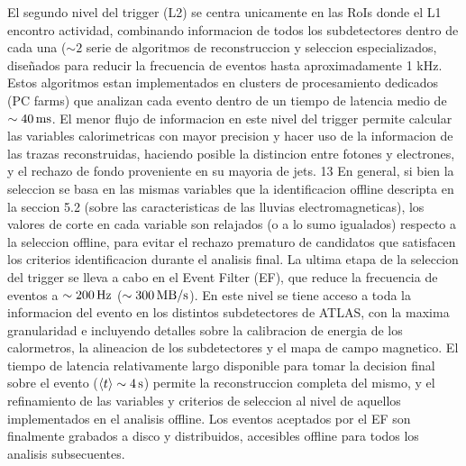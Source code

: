 El segundo nivel del trigger (L2) se centra unicamente en las RoIs donde el L1
encontro actividad, combinando informacion de todos los subdetectores dentro de
cada una ($\sim 2$ %
serie de algoritmos de reconstruccion y seleccion especializados, dise\~nados
para reducir la frecuencia de eventos hasta aproximadamente 1 kHz. Estos
algoritmos estan implementados en clusters de procesamiento dedicados (PC farms)
que analizan cada evento dentro de un tiempo de latencia medio de $\sim
\unit[40]{ms}$. El menor flujo de informacion en este nivel del trigger permite
calcular las variables calorimetricas con mayor precision y hacer uso de la
informacion de las trazas reconstruidas, haciendo posible la distincion entre
fotones y electrones, y el rechazo de fondo proveniente en su mayoria de jets.
13 En general, si bien la seleccion se basa en las mismas variables que la
identificacion offline descripta en la seccion 5.2 (sobre las caracteristicas de
las lluvias electromagneticas), los valores de corte en cada variable son
relajados (o a lo sumo igualados) respecto a la seleccion offline, para evitar
el rechazo prematuro de candidatos que satisfacen los criterios identificacion
durante el analisis final. La ultima etapa de la seleccion del trigger se lleva
a cabo en el Event Filter (EF), que reduce la frecuencia de eventos a $\sim
\unit[200]{Hz}$ ($\sim \unit[300]{MB/s}$). En este nivel se tiene acceso a toda
la informacion del evento en los distintos subdetectores de ATLAS, con la maxima
granularidad e incluyendo detalles sobre la calibracion de energia de los
calormetros, la alineacion de los subdetectores y el mapa de campo magnetico. El
tiempo de latencia relativamente largo disponible para tomar la decision final
sobre el evento ($\avg{t} \sim \unit[4]{s}$) permite la reconstruccion completa
del mismo, y el refinamiento de las variables y criterios de seleccion al nivel
de aquellos implementados en el analisis offline. Los eventos aceptados por el
EF son finalmente grabados a disco y distribuidos, accesibles offline para todos
los analisis subsecuentes.

